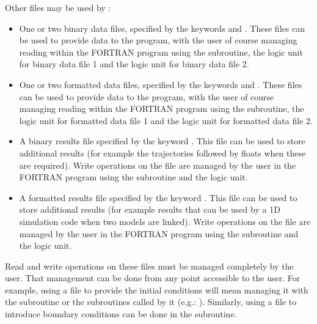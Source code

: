 Other files may be used by :
\begin{itemize}
\item One or two binary data files, specified by the keywords
 and .
These files can be used to provide data to the program, with the user
of course managing reading within the FORTRAN program using
the  subroutine,
the  logic unit for binary data file 1 and the 
logic unit for binary data file 2.

\item One or two formatted data files, specified by the keywords
 and .
These files can be used to provide data to the program, with the user
of course managing reading within the FORTRAN program using
the  subroutine,
the  logic unit for formatted data file 1
and the  logic unit for formatted data file 2.

\item A binary results file specified by the keyword
.
This file can be used to store additional results (for example the trajectories
followed by floats when these are required).
Write operations on the file are managed by the user in the FORTRAN program
using the  subroutine and
the  logic unit.

\item A formatted results file specified by the keyword
.
This file can be used to store additional results
(for example results that can be used by a 1D simulation code when two models
are linked).
Write operations on the file are managed by the user in the FORTRAN program
using the  subroutine and
the  logic unit.
\end{itemize}

Read and write operations on these files must be managed completely by the user.
That management can be done from any point accessible to the user.
For example, using a file to provide the initial conditions will mean managing
it with the  subroutine or the subroutines called by it
(e.g.: ).
Similarly, using a file to introduce boundary conditions can be done
in the  subroutine.

